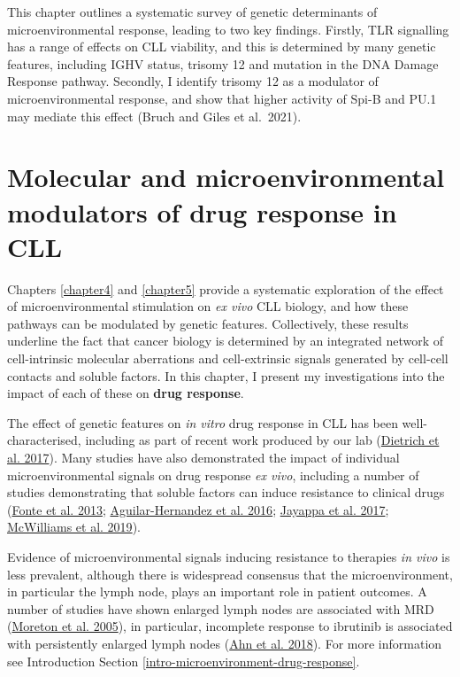 \documentclass[11pt, a4paper, twosided]{book}
\begin{document}
This chapter outlines a systematic survey of genetic determinants of microenvironmental response, leading to two key findings. Firstly, TLR signalling has a range of effects on CLL viability, and this is determined by many genetic features, including IGHV status, trisomy 12 and mutation in the DNA Damage Response pathway. Secondly, I identify trisomy 12 as a modulator of microenvironmental response, and show that higher activity of Spi-B and PU.1 may mediate this effect (Bruch and Giles et al.~2021).

\hypertarget{chapter6}{%
\chapter{Molecular and microenvironmental modulators of drug response in CLL}\label{chapter6}}

Chapters \ref{chapter4} and \ref{chapter5} provide a systematic exploration of the effect of microenvironmental stimulation on \emph{ex vivo} CLL biology, and how these pathways can be modulated by genetic features. Collectively, these results underline the fact that cancer biology is determined by an integrated network of cell-intrinsic molecular aberrations and cell-extrinsic signals generated by cell-cell contacts and soluble factors. In this chapter, I present my investigations into the impact of each of these on \textbf{drug response}.

The effect of genetic features on \emph{in vitro} drug response in CLL has been well-characterised, including as part of recent work produced by our lab (\protect\hyperlink{ref-JCIpaper}{Dietrich et al. 2017}). Many studies have also demonstrated the impact of individual microenvironmental signals on drug response \emph{ex vivo}, including a number of studies demonstrating that soluble factors can induce resistance to clinical drugs (\protect\hyperlink{ref-Fonte2013}{Fonte et al. 2013}; \protect\hyperlink{ref-AguilarHernandez2016}{Aguilar-Hernandez et al. 2016}; \protect\hyperlink{ref-Jayappa2017}{Jayappa et al. 2017}; \protect\hyperlink{ref-McWilliams2019}{McWilliams et al. 2019}).

Evidence of microenvironmental signals inducing resistance to therapies \emph{in vivo} is less prevalent, although there is widespread consensus that the microenvironment, in particular the lymph node, plays an important role in patient outcomes. A number of studies have shown enlarged lymph nodes are associated with MRD (\protect\hyperlink{ref-Moreton2005}{Moreton et al. 2005}), in particular, incomplete response to ibrutinib is associated with persistently enlarged lymph nodes (\protect\hyperlink{ref-Ahn2018}{Ahn et al. 2018}). For more information see Introduction Section \ref{intro-microenvironment-drug-response}.
\end{document}
